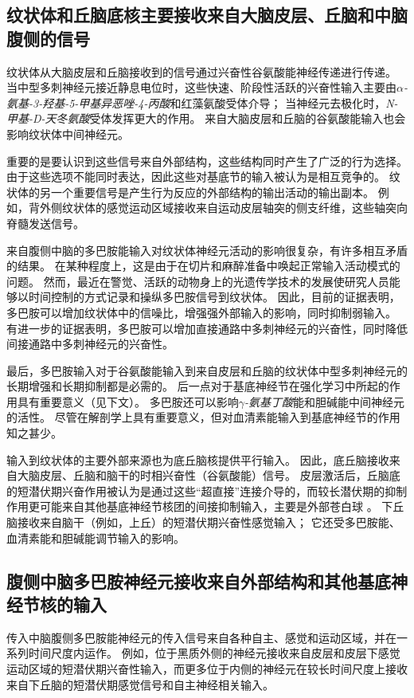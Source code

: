 \subsection{纹状体和丘脑底核主要接收来自大脑皮层、丘脑和中脑腹侧的信号}

纹状体从大脑皮层和丘脑接收到的信号通过兴奋性谷氨酸能神经传递进行传递。
当中型多刺神经元接近静息电位时，这些快速、阶段性活跃的兴奋性输入主要由\textit{$\alpha$-氨基-3-羟基-5-甲基异恶唑-4-丙酸}和红藻氨酸受体介导；
当神经元去极化时，\textit{N-甲基-D-天冬氨酸}受体发挥更大的作用。
来自大脑皮层和丘脑的谷氨酸能输入也会影响纹状体中间神经元。


重要的是要认识到这些信号来自外部结构，这些结构同时产生了广泛的行为选择。
由于这些选项不能同时表达，因此这些对基底节的输入被认为是相互竞争的。
纹状体的另一个重要信号是产生行为反应的外部结构的输出活动的输出副本。
例如，背外侧纹状体的感觉运动区域接收来自运动皮层轴突的侧支纤维，这些轴突向脊髓发送信号。


来自腹侧中脑的多巴胺能输入对纹状体神经元活动的影响很复杂，有许多相互矛盾的结果。
在某种程度上，这是由于在切片和麻醉准备中唤起正常输入活动模式的问题。
然而，最近在警觉、活跃的动物身上的光遗传学技术的发展使研究人员能够以时间控制的方式记录和操纵多巴胺信号到纹状体。
因此，目前的证据表明，多巴胺可以增加纹状体中的信噪比，增强强外部输入的影响，同时抑制弱输入。
有进一步的证据表明，多巴胺可以增加直接通路中多刺神经元的兴奋性，同时降低间接通路中多刺神经元的兴奋性。


最后，多巴胺输入对于谷氨酸能输入到来自皮层和丘脑的纹状体中型多刺神经元的长期增强和长期抑制都是必需的。
后一点对于基底神经节在强化学习中所起的作用具有重要意义（见下文）。
多巴胺还可以影响\textit{$\gamma$-氨基丁酸}能和胆碱能中间神经元的活性。
尽管在解剖学上具有重要意义，但对血清素能输入到基底神经节的作用知之甚少。


输入到纹状体的主要外部来源也为底丘脑核提供平行输入。
因此，底丘脑接收来自大脑皮层、丘脑和脑干的时相兴奋性（谷氨酸能）信号。
皮层激活后，丘脑底的短潜伏期兴奋作用被认为是通过这些“超直接”连接介导的，而较长潜伏期的抑制作用更可能来自其他基底神经节核团的间接抑制输入，主要是外部苍白球 。
下丘脑接收来自脑干（例如，上丘）的短潜伏期兴奋性感觉输入；
它还受多巴胺能、血清素能和胆碱能调节输入的影响。



\subsection{腹侧中脑多巴胺神经元接收来自外部结构和其他基底神经节核的输入}

传入中脑腹侧多巴胺能神经元的传入信号来自各种自主、感觉和运动区域，并在一系列时间尺度内运作。
例如，位于黑质外侧的神经元接收来自皮层和皮层下感觉运动区域的短潜伏期兴奋性输入，而更多位于内侧的神经元在较长时间尺度上接收来自下丘脑的短潜伏期感觉信号和自主神经相关输入。



